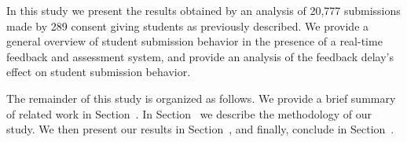 In this study we present the results obtained by an analysis of 20,777
submissions made by 289 consent giving students as previously described. We
provide a general overview of student submission behavior in the presence of a
real-time feedback and assessment system, and provide an analysis of the
feedback delay's effect on student submission behavior.

The remainder of this study is organized as follows. We provide a brief summary
of related work in Section~. In
Section~ we describe the methodology of our study. We
then present our results in Section~, and finally,
conclude in Section~.
